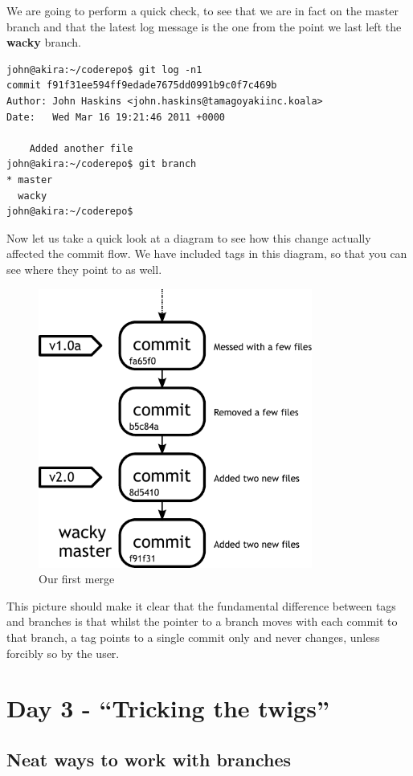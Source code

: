 We are going to perform a quick check, to see that we are in fact on the master branch and that the latest log message is the one from the point we last left the \textbf{wacky} branch.

\begin{Verbatim}[frame=leftline,framerule=1mm,fontsize=\relsize{-3}] 
john@akira:~/coderepo$ git log -n1
commit f91f31ee594ff9edade7675dd0991b9c0f7c469b
Author: John Haskins <john.haskins@tamagoyakiinc.koala>
Date:   Wed Mar 16 19:21:46 2011 +0000

    Added another file
john@akira:~/coderepo$ git branch
* master
  wacky
john@akira:~/coderepo$ 
\end{Verbatim}

Now let us take a quick look at a diagram to see how this change actually affected the commit flow.  We have included tags in this diagram, so that you can see where they point to as well.

\begin{figure}[hbt]
\centering
\includegraphics[width=9cm]{images/f-w4-d2.pdf}
\caption{Our first merge}
\end{figure}

This picture should make it clear that the fundamental difference between tags and branches is that whilst the pointer to a branch moves with each commit to that branch, a tag points to a single commit only and never changes, unless forcibly so by the user.

\section{Day 3 - ``Tricking the twigs''}
\subsection{Neat ways to work with branches}

